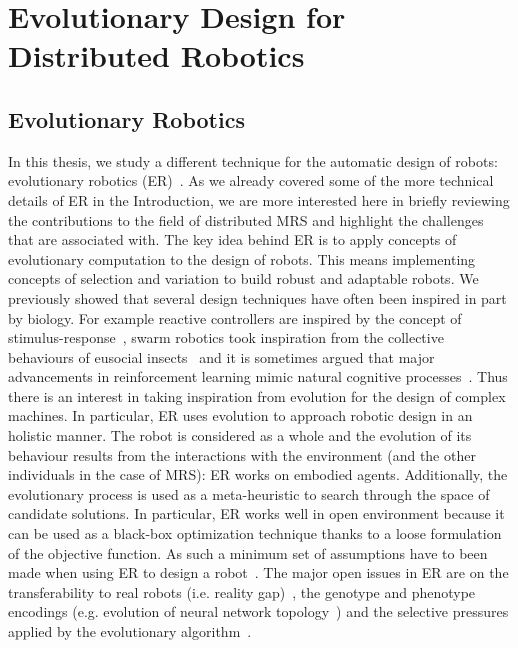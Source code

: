 
\section{Evolutionary Design for Distributed Robotics}

  \subsection{Evolutionary Robotics} %

    In this thesis, we study a different technique for the automatic design of robots: evolutionary robotics (ER)~\parencite{Nolfi2000, Doncieux2015a}. As we already covered some of the more technical details of ER in the Introduction, we are more interested here in briefly reviewing the contributions to the field of distributed MRS and highlight the challenges that are associated with. The key idea behind ER is to apply concepts of evolutionary computation to the design of robots. This means implementing concepts of selection and variation to build robust and adaptable robots. We previously showed that several design techniques have often been inspired in part by biology. For example reactive controllers are inspired by the concept of stimulus-response~\parencite{Brooks1986}, swarm robotics took inspiration from the collective behaviours of eusocial insects~\parencite{Bonabeau1999} and it is sometimes argued that major advancements in reinforcement learning mimic natural cognitive processes~\parencite{Montague1996}. Thus there is an interest in taking inspiration from evolution for the design of complex machines. In particular, ER uses evolution to approach robotic design in an holistic manner. The robot is considered as a whole and the evolution of its behaviour results from the interactions with the environment (and the other individuals in the case of MRS): ER works on embodied agents. Additionally, the evolutionary process is used as a meta-heuristic to search through the space of candidate solutions. In particular, ER works well in open environment because it can be used as a black-box optimization technique thanks to a loose formulation of the objective function. As such a minimum set of assumptions have to been made when using ER to design a robot~\parencite{Bongard2013a}. The major open issues in ER are on the transferability to real robots (i.e. reality gap)~\parencite{Mouret2012b, Cully2015}, the genotype and phenotype encodings (e.g. evolution of neural network topology~\parencite{Stanley2002}) and the selective pressures applied by the evolutionary algorithm~\parencite{Lehman2011, Mouret2012a}.

